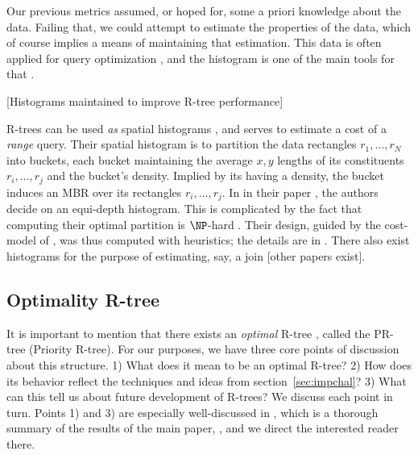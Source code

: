 Our previous metrics assumed, or hoped for, some a priori knowledge about the data.
Failing that, we could attempt to estimate the properties of the data, which of course implies a means of maintaining that estimation.
This data is often applied for query optimization \cite{chaudhuri98}, and the histogram is one of the main tools for that \cite{poosalahaasioannidisshekita96}.

[Histograms maintained to improve R-tree performance]

R-trees can be used \emph{as} spatial histograms \cite{achakeevseeger12}, and serves to estimate a cost of a \emph{range} query.
Their spatial histogram is to partition the data rectangles $r_1,\ldots,r_N$ into buckets, each bucket maintaining the average $x,y$ lengths of its constituents $r_i,\ldots,r_j$ and the bucket's density.
Implied by its having a density, the bucket induces an MBR over its rectangles $r_i,\ldots,r_j$.
In in their paper \cite{achakeevseeger12}, the authors decide on an equi-depth histogram.
This is complicated by the fact that computing their optimal partition is $\NP$-hard \cite{muthukrishnanpoosalasuel99}.
Their design, guided by the cost-model of \cite{theodoridissellis96}, was thus computed with heuristics; the details are in \cite{achakeevseeger12a}.
There also exist histograms for the purpose of estimating, say, a join \cite{aboulnaganaughton00} [other papers exist].

\subsection{Optimality R-tree}
It is important to mention that there exists an \emph{optimal} R-tree \cite{argeberghaverkortyi04}, called the PR-tree (Priority R-tree).
For our purposes, we have three core points of discussion about this structure.
1) What does it mean to be an optimal R-tree?
2) How does its behavior reflect the techniques and ideas from section~\ref{sec:impchal}?
3) What can this tell us about future development of R-trees?
We discuss each point in turn.
Points 1) and 3) are especially well-discussed in \cite{yi12}, which is a thorough summary of the results of the main paper, \cite{argeberghaverkortyi04}, and we direct the interested reader there.

